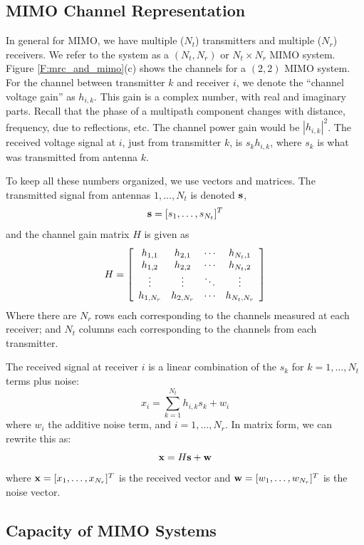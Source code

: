 \subsection{MIMO Channel Representation}

In general for MIMO, we have multiple ($N_t$) transmitters and multiple ($N_r$) receivers.  We refer to the system as a $(N_t,N_r)$ or $N_t \times N_r$ MIMO system.  Figure \ref{F:mrc_and_mimo}(c) shows the channels for a $(2,2)$ MIMO system.  For the channel between transmitter $k$ and receiver $i$, we denote the ``channel voltage gain'' as $h_{i,k}$.  This gain is a complex number, with real and imaginary parts.  Recall that the phase of a multipath component changes with distance, frequency, due to reflections, etc.  The channel power gain would be $|h_{i,k}|^2$. The received voltage signal at $i$, just from transmitter $k$, is $s_k h_{i,k}$, where $s_k$ is what was transmitted from antenna $k$.  

To keep all these numbers organized, we use vectors and matrices.  The transmitted signal from antennas $1, \ldots, N_t$ is denoted $\mathbf{s}$, 
\[
\mathbf{s} = [s_1, \ldots, s_{N_t}]^T
\]
and the channel gain matrix $H$ is given as
\begin{equation} \label{E:H}
H = \left[ \begin{array}{cccc} 
   h_{1,1} & h_{2,1} & \cdots & h_{N_t,1} \\
   h_{1,2} & h_{2,2} & \cdots & h_{N_t,2} \\
   \vdots & \vdots &  \ddots & \vdots \\
   h_{1,N_r} & h_{2,N_r} & \cdots & h_{N_t,N_r} \\
 \end{array} \right]
\end{equation}
Where there are $N_r$ rows each corresponding to the channels measured at each receiver; and $N_t$ columns each corresponding to the channels from each transmitter.

The received signal at receiver $i$ is a linear combination of the $s_k$ for $k=1,\ldots ,N_t$ terms plus noise:
\[
x_i = \sum_{k=1}^{N_t} h_{i,k} s_k + w_i
\]
where $w_i$ the additive noise term, and $i=1, \ldots, N_r$.  In matrix form, we can rewrite this as:
\[
\mathbf{x} = H \mathbf{s} + \mathbf{w}
\]
where $\mathbf{x} = [x_1, \ldots, x_{N_r}]^T$ is the received vector and $\mathbf{w} = [w_1, \ldots, w_{N_r}]^T$ is the noise vector.



\subsection{Capacity of MIMO Systems}

